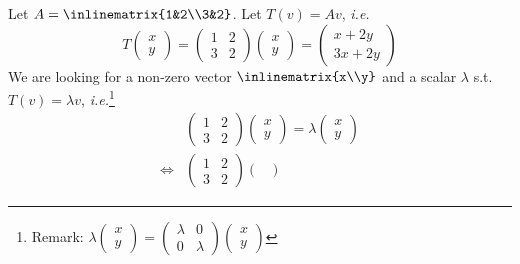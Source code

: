 \begin{exm}\label{exm-eigenvectors-eigenvalues}
	Let $A=\inlinematrix{1&2\\3&2}$. Let $T(v)=Av$,
	\textit{i.e.}
	\begin{equation*}
		T\begin{pmatrix}
			x \\y
		\end{pmatrix}=\begin{pmatrix}
			1 & 2 \\
			3 & 2
		\end{pmatrix}\begin{pmatrix}
			x \\ y
		\end{pmatrix}=\begin{pmatrix}
			x + 2y \\
			3x + 2y
		\end{pmatrix}
	\end{equation*}
	We are looking for a non-zero vector $\inlinematrix{x\\y}$
	and a scalar $\lambda$ s.t. $T(v)=\lambda v$, \textit{i.e.}\footnote{Remark:
		$\lambda\left(
			\begin{smallmatrix}
				x\\y
			\end{smallmatrix}
			\right)=\left(
			\begin{smallmatrix}
				\lambda & 0 \\
				0 & \lambda
			\end{smallmatrix}
			\right)\left(
			\begin{smallmatrix}
				x \\ y
			\end{smallmatrix}
			\right)$}
	\begin{align*}
		 & \begin{pmatrix}
			1 & 2 \\
			3 & 2
		\end{pmatrix}\begin{pmatrix}
			x \\ y
		\end{pmatrix}=\lambda\begin{pmatrix}
			x \\ y
		\end{pmatrix}                            \\
		\Leftrightarrow
		 & \begin{pmatrix}
			1 & 2 \\
			3 & 2
		\end{pmatrix}\begin{pmatrix}

\end{pmatrix}
\end{align*}
\end{exm}
